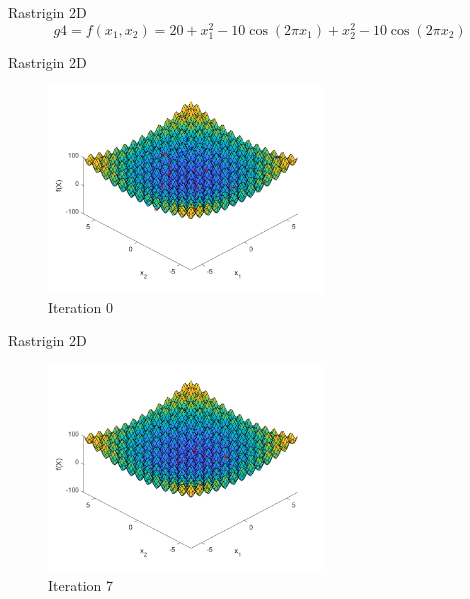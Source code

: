 \documentclass[xcolor=table]{beamer}
\begin{document}
\begin{frame}{Rastrigin 2D}
  $$
   g4= f(x_1, x_2) = 20 + x_1^2 - 10 \cos(2\pi x_1) + x_2^2 - 10 \cos(2\pi x_2)
  $$
\end{frame}
\begin{frame}{Rastrigin 2D}
  \begin{figure}[h]
  \begin{center}
    \includegraphics[width=0.65\textwidth]{img/smpl/rast2d/loa-iter-0}
    \caption{Iteration 0}
  \end{center}
  \end{figure}
\end{frame}
\begin{frame}{Rastrigin 2D}
  \begin{figure}[h]
  \begin{center}
    \includegraphics[width=0.65\textwidth]{img/smpl/rast2d/loa-iter-7}
    \caption{Iteration 7}
  \end{center}
  \end{figure}
\end{frame}
\end{document}
